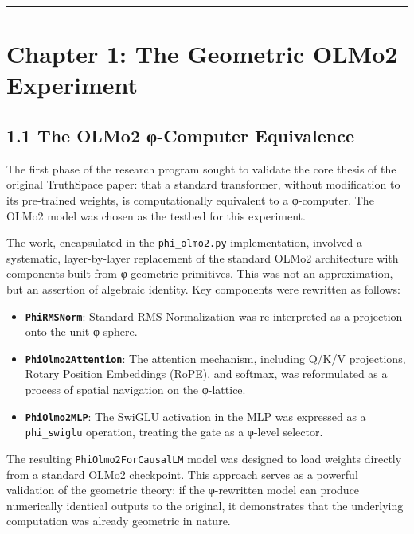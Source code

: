 \documentclass[
  twocolumn,
  10pt,
  a4paper]{article}
\providecommand{\tightlist}{%
  \setlength{\itemsep}{0pt}\setlength{\parskip}{0pt}}
\begin{document}
\begin{center}\rule{0.5\linewidth}{0.5pt}\end{center}

\hypertarget{chapter-1-the-geometric-olmo2-experiment}{%
\FloatBarrier
\section{Chapter 1: The Geometric OLMo2
Experiment}\label{chapter-1-the-geometric-olmo2-experiment}}

\hypertarget{the-olmo2-ux3c6-computer-equivalence}{%
\subsection{1.1 The OLMo2 φ-Computer
Equivalence}\label{the-olmo2-ux3c6-computer-equivalence}}

The first phase of the research program sought to validate the core
thesis of the original TruthSpace paper: that a standard transformer,
without modification to its pre-trained weights, is computationally
equivalent to a φ-computer. The OLMo2 model was chosen as the testbed
for this experiment.

The work, encapsulated in the \texttt{phi\_olmo2.py} implementation,
involved a systematic, layer-by-layer replacement of the standard OLMo2
architecture with components built from φ-geometric primitives. This was
not an approximation, but an assertion of algebraic identity. Key
components were rewritten as follows:

\begin{itemize}
\tightlist
\item
  \textbf{\texttt{PhiRMSNorm}}: Standard RMS Normalization was
  re-interpreted as a projection onto the unit φ-sphere.
\item
  \textbf{\texttt{PhiOlmo2Attention}}: The attention mechanism,
  including Q/K/V projections, Rotary Position Embeddings (RoPE), and
  softmax, was reformulated as a process of spatial navigation on the
  φ-lattice.
\item
  \textbf{\texttt{PhiOlmo2MLP}}: The SwiGLU activation in the MLP was
  expressed as a \texttt{phi\_swiglu} operation, treating the gate as a
  φ-level selector.
\end{itemize}

The resulting \texttt{PhiOlmo2ForCausalLM} model was designed to load
weights directly from a standard OLMo2 checkpoint. This approach serves
as a powerful validation of the geometric theory: if the φ-rewritten
model can produce numerically identical outputs to the original, it
demonstrates that the underlying computation was already geometric in
nature.
\end{document}
